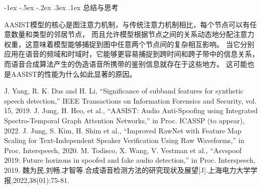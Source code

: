 \documentclass[12pt, a4paper]{article}
\makeatletter
\newcommand*{\hei}{\CJKfamily{zhhei}}
\newcommand{\xiaosihao}{\fontsize{12pt}{\baselineskip}\selectfont}
\renewcommand\subsubsection{\@startsection{subsubsection}{1}{\z@}%
{-1ex \@plus -.5ex \@minus -.2ex}%
{.3ex \@plus .1ex}%
{\normalfont\xiaosihao\hei}}
\makeatother
\begin{document}
\subsubsection{总结与思考}

AASIST模型的核心是图注意力机制，与传统注意力机制相比，每个节点可以有任意数量和类型的邻居节点，
而且允许模型根据节点之间的关系动态地分配注意力权重，这意味着模型能够捕捉到图中任意两个节点间的复杂相互影响。
当它分别应用在语音的频域和时域时，它能够更容易捕捉到跨时间和跨子带中的信息关系，而语音合成算法产生的伪造语音所携带的鉴别信息就存在于这些地方。
这可能也是AASIST的性能为什么如此显著的原因。

\begin{thebibliography}{4}
	J. Yang, R. K. Das and H. Li, “Signiﬁcance of subband features for synthetic speech detection,” IEEE Transactions on Information Forensics and Security, vol. 15, 2019.
	J. Jung, H. Heo, et al., “AASIST: Audio Anti-Spooﬁng using Integrated Spectro-Temporal Graph Attention Networks,” in Proc. ICASSP (to appear), 2022.
	J. Jung, S. Kim, H. Shim et al., “Improved RawNet with Feature Map Scaling for Text-Independent Speaker Veriﬁcation Using Raw Waveforms,” in Proc. Interspeech, 2020.
	M. Todisco, X. Wang, V. Vestman et al., “Asvspoof 2019: Future horizons in spoofed and fake audio detection,” in Proc. Interspeech, 2019.
     魏为民,刘畅,才智等.合成语音检测方法的研究现状及展望[J].上海电力大学学报,2022,38(01):75-81.
\end{thebibliography}
\end{document}
